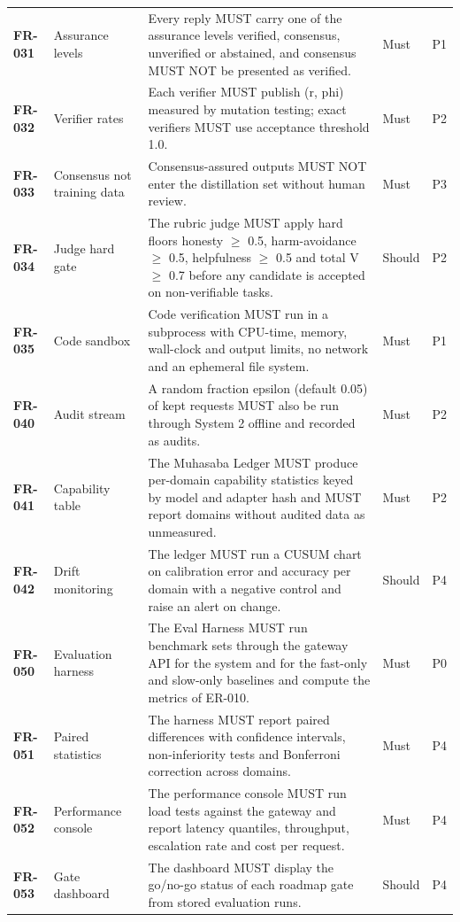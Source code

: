 \begin{longtable}{@{}p{1.45cm}p{2.5cm}p{8.1cm}p{1.6cm}p{1.1cm}@{}}
\textbf{FR-031} & Assurance levels & Every reply MUST carry one of the assurance levels verified, consensus, unverified or abstained, and consensus MUST NOT be presented as verified. & Must & P1\\
\textbf{FR-032} & Verifier rates & Each verifier MUST publish (r, phi) measured by mutation testing; exact verifiers MUST use acceptance threshold 1.0. & Must & P2\\
\textbf{FR-033} & Consensus not training data & Consensus-assured outputs MUST NOT enter the distillation set without human review. & Must & P3\\
\textbf{FR-034} & Judge hard gate & The rubric judge MUST apply hard floors honesty $\ge$ 0.5, harm-avoidance $\ge$ 0.5, helpfulness $\ge$ 0.5 and total V $\ge$ 0.7 before any candidate is accepted on non-verifiable tasks. & Should & P2\\
\textbf{FR-035} & Code sandbox & Code verification MUST run in a subprocess with CPU-time, memory, wall-clock and output limits, no network and an ephemeral file system. & Must & P1\\
\textbf{FR-040} & Audit stream & A random fraction epsilon (default 0.05) of kept requests MUST also be run through System 2 offline and recorded as audits. & Must & P2\\
\textbf{FR-041} & Capability table & The Muhasaba Ledger MUST produce per-domain capability statistics keyed by model and adapter hash and MUST report domains without audited data as unmeasured. & Must & P2\\
\textbf{FR-042} & Drift monitoring & The ledger MUST run a CUSUM chart on calibration error and accuracy per domain with a negative control and raise an alert on change. & Should & P4\\
\textbf{FR-050} & Evaluation harness & The Eval Harness MUST run benchmark sets through the gateway API for the system and for the fast-only and slow-only baselines and compute the metrics of ER-010. & Must & P0\\
\textbf{FR-051} & Paired statistics & The harness MUST report paired differences with confidence intervals, non-inferiority tests and Bonferroni correction across domains. & Must & P4\\
\textbf{FR-052} & Performance console & The performance console MUST run load tests against the gateway and report latency quantiles, throughput, escalation rate and cost per request. & Must & P4\\
\textbf{FR-053} & Gate dashboard & The dashboard MUST display the go/no-go status of each roadmap gate from stored evaluation runs. & Should & P4\\

\end{longtable}
